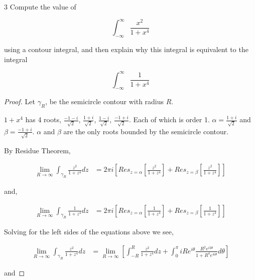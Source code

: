 \documentclass{article}
\begin{document}
\bigskip

\begin{PROB}{3}\label{Problem 3.}
    Compute the value of 
    
    \begin{equation*}
        \int_{-\infty}^{\infty} \frac{x^2}{1 + x^4}
    \end{equation*}

    using a contour integral, and then explain why this integral is equivalent to the integral

    \begin{equation*}
        \int_{-\infty}^{\infty} \frac{1}{1 + x^4}
    \end{equation*}
\end{PROB}
\begin{proof}
    Let $\gamma_R$, be the semicircle contour with radius $R$.
    
    $1 + x^4$ has 4 roots, $\frac{-1  - i}{\sqrt{2}}$, $\frac{1  + i}{\sqrt{2}}$, $\frac{1 - i}{\sqrt{2}}$, $\frac{-1 + i}{\sqrt{2}}$. Each of which is order 1. $\alpha = \frac{1  + i}{\sqrt{2}}$ and $\beta = \frac{-1 + i}{\sqrt{2}}$. $\alpha$ and $\beta$ are the only roots bounded by the semicircle contour. 
    
    By Residue Theorem, 

    \begin{align*}
        \lim_{R \to \infty} \int_{\gamma_R} \frac{z^2}{1 + z^4} dz &= 2 \pi i \left[Res_{z = \alpha}\left[\frac{z^2}{1 + z^4}\right] + Res_{z = \beta}\left[\frac{z^2}{1 + z^4}\right]\right]
    \end{align*}

    and, 

    \begin{align*}
        \lim_{R \to \infty} \int_{\gamma_R} \frac{1}{1 + z^4} dz &= 2 \pi i \left[Res_{z = \alpha}\left[\frac{1}{1 + z^4}\right] + Res_{z = \beta}\left[\frac{1}{1 + z^4}\right]\right]
    \end{align*}

    Solving for the left sides of the equations above we see, 

    \begin{align*}
        \lim_{R \to \infty} \int_{\gamma_R} \frac{z^2}{1 + z^4} dz &= \lim_{R \to \infty} \left[\int_{-R}^{R}  \frac{z^2}{1 + z^4} dz + \int_{0}^{\pi} iRe^{i \theta} \frac{R^2e^{i 2\theta}}{1 + R^{4}e^{4 i \theta}} d \theta \right] 
    \end{align*}

    and


\end{proof}
\end{document}
